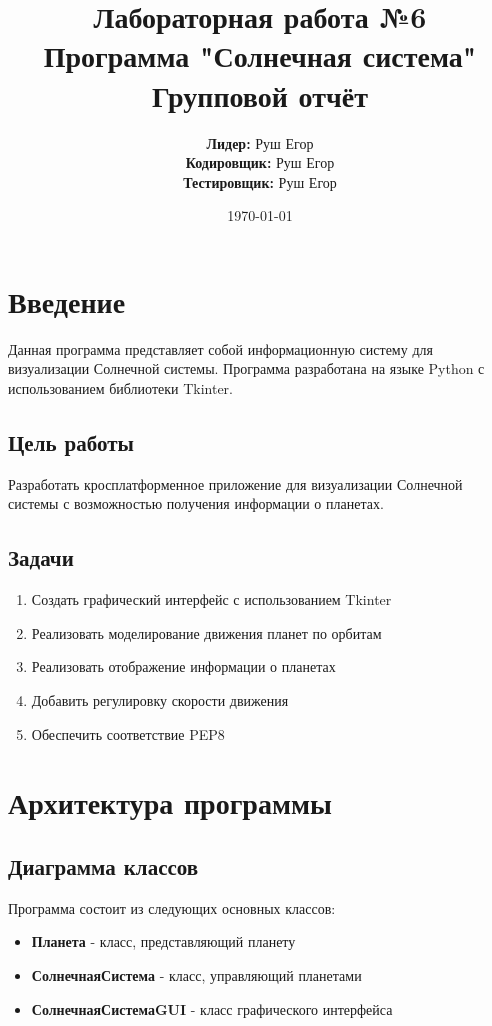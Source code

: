 \documentclass[12pt,a4paper]{article}
\title{
    \textbf{Лабораторная работа №6} \\
    \large{Программа "Солнечная система"} \\
    \textbf{Групповой отчёт}
}
\author{
    \textbf{Лидер:} Руш Егор \\
    \textbf{Кодировщик:} Руш Егор \\
    \textbf{Тестировщик:} Руш Егор
}
\date{\today}
\begin{document}
\maketitle

\tableofcontents
\newpage

\section{Введение}

Данная программа представляет собой информационную систему для визуализации Солнечной системы. Программа разработана на языке Python с использованием библиотеки Tkinter.

\subsection{Цель работы}
Разработать кросплатформенное приложение для визуализации Солнечной системы с возможностью получения информации о планетах.

\subsection{Задачи}
\begin{enumerate}
    \item Создать графический интерфейс с использованием Tkinter
    \item Реализовать моделирование движения планет по орбитам
    \item Реализовать отображение информации о планетах
    \item Добавить регулировку скорости движения
    \item Обеспечить соответствие PEP8
\end{enumerate}

\section{Архитектура программы}

\subsection{Диаграмма классов}

Программа состоит из следующих основных классов:

\begin{itemize}
    \item \textbf{Планета} - класс, представляющий планету
    \item \textbf{СолнечнаяСистема} - класс, управляющий планетами
    \item \textbf{СолнечнаяСистемаGUI} - класс графического интерфейса
\end{itemize}
\end{document}

